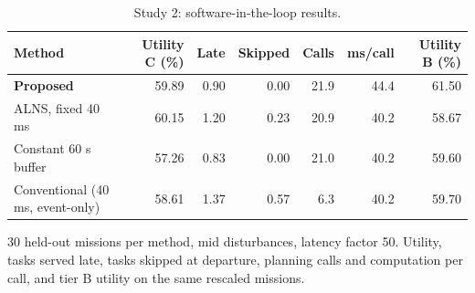 \begin{table}[t]
\caption{Study 2: software-in-the-loop results.}\label{tab:s2tierc}
\centering\small
\begin{threeparttable}
\begin{tabular}{lrrrrrr}
\toprule
Method & Utility C (\%) & Late & Skipped & Calls & ms/call & Utility B (\%) \\
\midrule
\textbf{Proposed} & 59.89 & 0.90 & 0.00 & 21.9 & 44.4 & 61.50 \\
ALNS, fixed 40 ms & 60.15 & 1.20 & 0.23 & 20.9 & 40.2 & 58.67 \\
Constant 60 s buffer & 57.26 & 0.83 & 0.00 & 21.0 & 40.2 & 59.60 \\
Conventional (40 ms, event-only) & 58.61 & 1.37 & 0.57 & 6.3 & 40.2 & 59.70 \\
\bottomrule
\end{tabular}
\begin{tablenotes}[flushleft]\scriptsize
\item[] 30 held-out missions per method, mid disturbances, latency factor 50. Utility, tasks served late, tasks skipped at departure, planning calls and computation per call, and tier B utility on the same rescaled missions.
\end{tablenotes}
\end{threeparttable}
\end{table}
